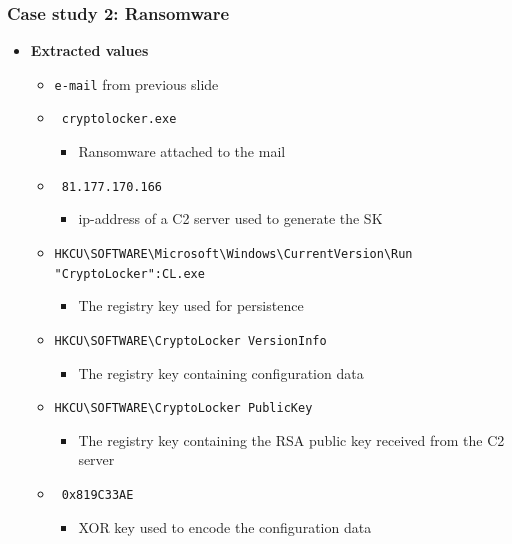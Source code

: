 \begin{frame}[fragile]
    \frametitle{Case study 2: Ransomware}
    \begin{itemize}
        \item[] \textbf{Extracted values}
        \begin{itemize}
            \item \texttt{e-mail} from previous slide
            \item \texttt{\color{black} cryptolocker.exe}
            \begin{itemize}
                \item Ransomware attached to the mail
            \end{itemize}
            \item \texttt{\color{black} 81.177.170.166}
            \begin{itemize}
                \item ip-address of a C2 server used to generate the SK
            \end{itemize}
            \item \lstinline|HKCU\SOFTWARE\Microsoft\Windows\CurrentVersion\Run "CryptoLocker":CL.exe|
            \begin{itemize}
                \item The registry key used for persistence
            \end{itemize}
            \item \lstinline|HKCU\SOFTWARE\CryptoLocker VersionInfo|
            \begin{itemize}
                \item The registry key containing configuration data
            \end{itemize}
            \item \lstinline|HKCU\SOFTWARE\CryptoLocker PublicKey|
            \begin{itemize}
                \item The registry key containing the RSA public key received from the C2 server
            \end{itemize}
            \item \texttt{\color{black} 0x819C33AE}
            \begin{itemize}
                \item XOR key used to encode the configuration data
            \end{itemize}
        \end{itemize}
    \end{itemize}

\end{frame}

